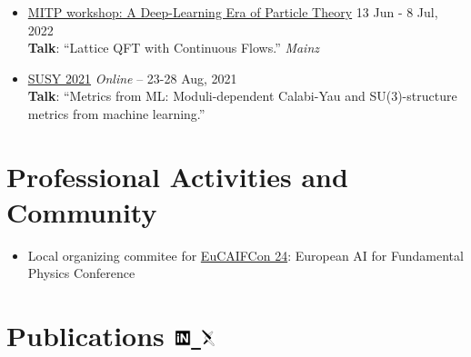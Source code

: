 \documentclass[11pt]{article}
\newcommand{\dateright}[1]{\hfill{\small\color{accentblue} #1}}
\begin{document}
\begin{itemize}[resume, itemsep=3.5pt]
    \item {\href{https://indico.mitp.uni-mainz.de/event/254/overview}{MITP workshop: A Deep-Learning Era of Particle Theory}} \dateright{ 13 Jun - 8 Jul, 2022} \\
    {\footnotesize \textbf{Talk}: “Lattice QFT with Continuous Flows.”} \dateright{{\color{black}\textit{Mainz}}}

    \item {\href{https://indico.cern.ch/event/875077/contributions/4481976/}{SUSY 2021}} \dateright{{\color{black}\textit{Online} --} 23-28 Aug, 2021} \\
    {\footnotesize \textbf{Talk}: “Metrics from ML: Moduli-dependent Calabi-Yau and SU(3)-structure metrics from machine learning.”} %

\end{itemize}

\section*{Professional Activities and Community}
\begin{itemize}[left=0pt, itemsep=3pt]
    \item Local organizing commitee for \href{https://www.aanmelder.nl/eucaifcon24}{EuCAIFCon 24}: European AI for Fundamental Physics Conference
\end{itemize}


\section*{Publications \hfill
{ \small
\href{https://inspirehep.net/authors/2107097}{\includegraphics[height=14pt]{inspire.pdf} \hspace*{-7pt} } \hspace*{10pt}
\href{https://arxiv.org/a/gerdes_m_1.html}{\includegraphics[height=14pt]{arxiv.pdf} \hspace*{-10pt} }
}
}
\end{document}

